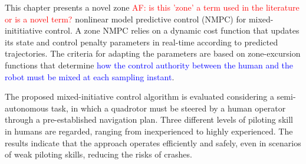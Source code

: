 This chapter presents a novel zone \textcolor{red}{AF: is this 'zone' a term used in the literature or is a novel term?} nonlinear model predictive control (NMPC) for mixed-inititiative control. A zone NMPC relies on a dynamic cost function that updates its state and control penalty parameters in real-time according to predicted trajectories. The criteria for adapting the parameters are based on zone-excursion functions that determine \textcolor{blue}{how the control authority between the human and the robot must be mixed at each sampling instant}. 

The proposed mixed-initiative control algorithm is evaluated considering a semi-autonomous task, in which a quadrotor must be steered by a human operator through a pre-established navigation plan. Three different levels of piloting skill in humans are regarded, ranging from inexperienced to highly experienced. The results indicate that the approach operates efficiently and safely, even in scenarios of weak piloting skills, reducing the risks of crashes. 
